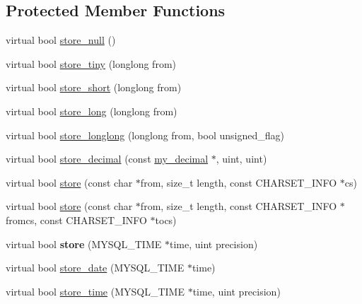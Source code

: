 \subsection*{Protected Member Functions}
\begin{DoxyCompactItemize}
\item 
virtual bool \mbox{\hyperlink{classProtocol__local_a91aac09fc4ccd9fa0191362a4072a824}{store\+\_\+null}} ()
\item 
virtual bool \mbox{\hyperlink{classProtocol__local_a2fb298b1c00ac82efa31b9d4a04c48cf}{store\+\_\+tiny}} (longlong from)
\item 
virtual bool \mbox{\hyperlink{classProtocol__local_a264c317143d608e94cc1bac803d46eca}{store\+\_\+short}} (longlong from)
\item 
virtual bool \mbox{\hyperlink{classProtocol__local_a2ec95fb26eb13927aa85989e6431db9d}{store\+\_\+long}} (longlong from)
\item 
virtual bool \mbox{\hyperlink{classProtocol__local_ae912b2b1882bef0b4140be5bbcee976e}{store\+\_\+longlong}} (longlong from, bool unsigned\+\_\+flag)
\item 
virtual bool \mbox{\hyperlink{classProtocol__local_a9586dbbd838cbcef1f9cc79296712a62}{store\+\_\+decimal}} (const \mbox{\hyperlink{classmy__decimal}{my\+\_\+decimal}} $\ast$, uint, uint)
\item 
virtual bool \mbox{\hyperlink{classProtocol__local_a1504dd8f6389ce0e262ad03d068cda3b}{store}} (const char $\ast$from, size\+\_\+t length, const C\+H\+A\+R\+S\+E\+T\+\_\+\+I\+N\+FO $\ast$cs)
\item 
virtual bool \mbox{\hyperlink{classProtocol__local_aa29b67ca49f2c3ed42914cd3e3f8ec3a}{store}} (const char $\ast$from, size\+\_\+t length, const C\+H\+A\+R\+S\+E\+T\+\_\+\+I\+N\+FO $\ast$fromcs, const C\+H\+A\+R\+S\+E\+T\+\_\+\+I\+N\+FO $\ast$tocs)
\item 
\mbox{\label{classProtocol__local_a7fd1253d8dcc35e74a0c061d83744754}} 
virtual bool {\bfseries store} (M\+Y\+S\+Q\+L\+\_\+\+T\+I\+ME $\ast$time, uint precision)
\item 
virtual bool \mbox{\hyperlink{classProtocol__local_a18671f3eea92ec56936c5b3ad6c89675}{store\+\_\+date}} (M\+Y\+S\+Q\+L\+\_\+\+T\+I\+ME $\ast$time)
\item 
virtual bool \mbox{\hyperlink{classProtocol__local_a0255894541e58369d2460a497e21c95f}{store\+\_\+time}} (M\+Y\+S\+Q\+L\+\_\+\+T\+I\+ME $\ast$time, uint precision)
\item 

\end{DoxyCompactItemize}

